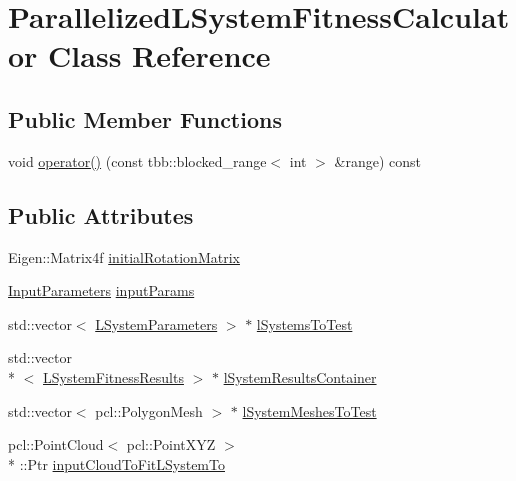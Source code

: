\hypertarget{classParallelizedLSystemFitnessCalculator}{\section{Parallelized\-L\-System\-Fitness\-Calculator Class Reference}
\label{classParallelizedLSystemFitnessCalculator}
}
\subsection*{Public Member Functions}
\begin{DoxyCompactItemize}
\item 
void \hyperlink{classParallelizedLSystemFitnessCalculator_a1f789c2a0f7a2f0fa469db4c788eca41}{operator()} (const tbb\-::blocked\-\_\-range$<$ int $>$ \&range) const 
\end{DoxyCompactItemize}
\subsection*{Public Attributes}
\begin{DoxyCompactItemize}
\item 
Eigen\-::\-Matrix4f \hyperlink{classParallelizedLSystemFitnessCalculator_a9815585129bdb124aec9386b044932e2}{initial\-Rotation\-Matrix}
\item 
\hyperlink{classInputParameters}{Input\-Parameters} \hyperlink{classParallelizedLSystemFitnessCalculator_a0cc33b29534993d9a43ae2b2dc7a8112}{input\-Params}
\item 
std\-::vector$<$ \hyperlink{classLSystemParameters}{L\-System\-Parameters} $>$ $\ast$ \hyperlink{classParallelizedLSystemFitnessCalculator_ad6da0730abb54dc15d9f8c3d7c076c35}{l\-Systems\-To\-Test}
\item 
std\-::vector\\*
$<$ \hyperlink{classLSystemFitnessResults}{L\-System\-Fitness\-Results} $>$ $\ast$ \hyperlink{classParallelizedLSystemFitnessCalculator_ac12326eda28a925883fe7ec78b61d6f8}{l\-System\-Results\-Container}
\item 
std\-::vector$<$ pcl\-::\-Polygon\-Mesh $>$ $\ast$ \hyperlink{classParallelizedLSystemFitnessCalculator_ad8eff5943f0da001ab54efe575c14f3b}{l\-System\-Meshes\-To\-Test}
\item 
pcl\-::\-Point\-Cloud$<$ pcl\-::\-Point\-X\-Y\-Z $>$\\*
\-::Ptr \hyperlink{classParallelizedLSystemFitnessCalculator_a75e602fceb0fbbe5f58973a9b4b67ff9}{input\-Cloud\-To\-Fit\-L\-System\-To}
\end{DoxyCompactItemize}


